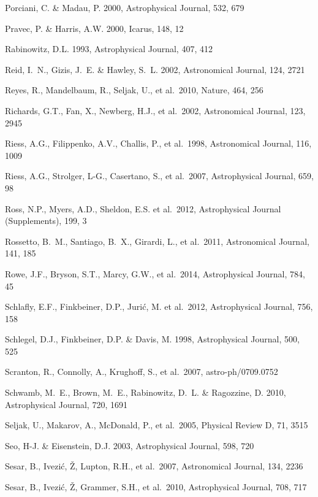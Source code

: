 \documentclass{emulateapj}
\begin{document}
\begin{thebibliography}{}
\bibitem[()]{} Porciani, C. \& Madau, P. 2000, Astrophysical Journal, 532, 679

\bibitem[()]{} Pravec, P. \& Harris, A.W. 2000, Icarus, 148, 12

\bibitem[()]{} Rabinowitz, D.L. 1993,  Astrophysical Journal, 407, 412

\bibitem[()]{} Reid, I.~N., Gizis, J.~E. \& Hawley, S.~L. 2002,  Astronomical Journal, 124, 2721 

\bibitem[()]{} Reyes, R., Mandelbaum, R., Seljak, U., et al.~2010, Nature, 464, 256

\bibitem[()]{} Richards, G.T., Fan, X., Newberg, H.J., et al.~2002, Astronomical Journal, 123, 2945

\bibitem[()]{} Riess, A.G., Filippenko, A.V., Challis, P., et al.~1998, Astronomical Journal, 116, 1009

\bibitem[()]{} Riess, A.G., Strolger, L-G., Casertano, S., et al.~2007, Astrophysical Journal, 659, 98

\bibitem[()]{} Ross, N.P., Myers, A.D., Sheldon, E.S. et al.~2012,
  Astrophysical Journal (Supplements), 199, 3

\bibitem[()]{} Rossetto, B.~M., Santiago, B.~X., Girardi, L., et al.~2011, Astronomical Journal, 141, 185

\bibitem[()]{} Rowe, J.F., Bryson, S.T., Marcy, G.W., et al.~2014, Astrophysical Journal, 784, 45

\bibitem[()]{} Schlafly, E.F., Finkbeiner, D.P., Juri\'c, M. et
  al.~2012, Astrophysical Journal, 756, 158

\bibitem[()]{} Schlegel, D.J., Finkbeiner, D.P. \& Davis, M. 1998, Astrophysical Journal, 500, 525

\bibitem[()]{} Scranton, R., Connolly, A., Krughoff, S., et al.~2007, astro-ph/0709.0752

\bibitem[()]{} Schwamb, M.~E., Brown, M.~E., Rabinowitz, D.~L. \& Ragozzine, D. 2010, Astrophysical Journal, 720, 1691

\bibitem[()]{} Seljak, U., Makarov, A., McDonald, P., et al.~2005,  Physical Review D, 71, 3515

\bibitem[()]{} Seo, H-J. \& Eisenstein, D.J. 2003, Astrophysical Journal, 598, 720

\bibitem[()]{} Sesar, B., Ivezi\'{c}, \v{Z}, Lupton, R.H., et al.~2007, Astronomical Journal, 134, 2236

\bibitem[()]{} Sesar, B., Ivezi\'{c}, \v{Z}, Grammer, S.H., et al.~2010, Astrophysical Journal, 708, 717


\end{thebibliography}
\end{document}
